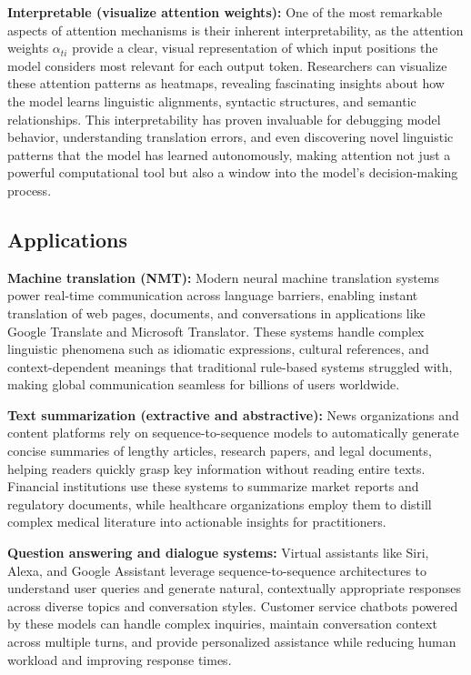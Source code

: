 \textbf{Interpretable (visualize attention weights):} One of the most remarkable aspects of attention mechanisms is their inherent interpretability, as the attention weights $\alpha_{ti}$ provide a clear, visual representation of which input positions the model considers most relevant for each output token. Researchers can visualize these attention patterns as heatmaps, revealing fascinating insights about how the model learns linguistic alignments, syntactic structures, and semantic relationships. This interpretability has proven invaluable for debugging model behavior, understanding translation errors, and even discovering novel linguistic patterns that the model has learned autonomously, making attention not just a powerful computational tool but also a window into the model's decision-making process.

\subsection{Applications}

\textbf{Machine translation (NMT):} Modern neural machine translation systems power real-time communication across language barriers, enabling instant translation of web pages, documents, and conversations in applications like Google Translate and Microsoft Translator. These systems handle complex linguistic phenomena such as idiomatic expressions, cultural references, and context-dependent meanings that traditional rule-based systems struggled with, making global communication seamless for billions of users worldwide.

\textbf{Text summarization (extractive and abstractive):} News organizations and content platforms rely on sequence-to-sequence models to automatically generate concise summaries of lengthy articles, research papers, and legal documents, helping readers quickly grasp key information without reading entire texts. Financial institutions use these systems to summarize market reports and regulatory documents, while healthcare organizations employ them to distill complex medical literature into actionable insights for practitioners.

\textbf{Question answering and dialogue systems:} Virtual assistants like Siri, Alexa, and Google Assistant leverage sequence-to-sequence architectures to understand user queries and generate natural, contextually appropriate responses across diverse topics and conversation styles. Customer service chatbots powered by these models can handle complex inquiries, maintain conversation context across multiple turns, and provide personalized assistance while reducing human workload and improving response times.

